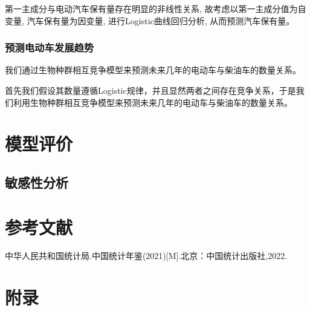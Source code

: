 \documentclass[12pt, a4paper, oneside]{ctexart}
\begin{document}
第一主成分与电动汽车保有量存在明显的非线性关系, 故考虑以第一主成分值为自变量, 汽车保有量为因变量, 进行Logistic曲线回归分析, 从而预测汽车保有量。

\subsubsection{预测电动车发展趋势}
我们通过生物种群相互竞争模型来预测未来几年的电动车与柴油车的数量关系。

首先我们假设其数量遵循Logistic规律，并且显然两者之间存在竞争关系，于是我们利用生物种群相互竞争模型来预测未来几年的电动车与柴油车的数量关系。



\section{模型评价}
\subsection{敏感性分析}

\section{参考文献}
\begin{thebibliography}{99}
    中华人民共和国统计局.中国统计年鉴(2021)[M].北京：中国统计出版社,2022.
\end{thebibliography}
\section{附录}
\end{document}
